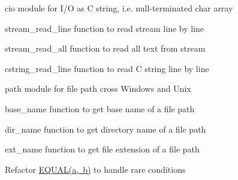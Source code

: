 
\begin{DoxyItemize}
\item {\ttfamily cio} module for I/O as C string, i.\+e. null-\/terminated {\ttfamily char} array
\begin{DoxyItemize}
\item {\ttfamily stream\+\_\+read\+\_\+line} function to read stream line by line
\item {\ttfamily stream\+\_\+read\+\_\+all} function to read all text from stream
\item {\ttfamily cstring\+\_\+read\+\_\+line} function to read C string line by line
\end{DoxyItemize}
\item {\ttfamily path} module for file path cross Windows and Unix
\begin{DoxyItemize}
\item {\ttfamily base\+\_\+name} function to get base name of a file path
\item {\ttfamily dir\+\_\+name} function to get directory name of a file path
\item {\ttfamily ext\+\_\+name} function to get file extension of a file path
\end{DoxyItemize}
\item Refactor {\ttfamily \mbox{\hyperlink{clibs__math_8h_aba775f84f3addcfe20e36d6d56a9ca3c}{E\+Q\+U\+A\+L(a, b)}}} to handle rare conditions 
\end{DoxyItemize}